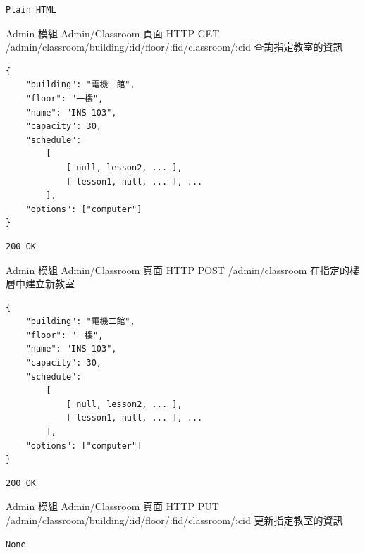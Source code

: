 \documentclass{article}
\begin{document}
\begin{lrbox}{\jsonoutputbox}
	\begin{lstlisting}
Plain HTML
\end{lstlisting}
\end{lrbox}

{Admin 模組}
{Admin/Classroom 頁面}
{HTTP GET}
{/admin/classroom/building/:id/floor/:fid/classroom/:cid}
{查詢指定教室的資訊}

\bigskip

\begin{lrbox}{\jsoninputbox}
	\begin{lstlisting}[basicstyle=\tiny\ttfamily]
{
	"building": "電機二館",
	"floor": "一樓",
	"name": "INS 103",
	"capacity": 30,
	"schedule":
		[
			[ null, lesson2, ... ],
			[ lesson1, null, ... ], ... 
		],
	"options": ["computer"]
}
\end{lstlisting}
\end{lrbox}

\begin{lrbox}{\jsonoutputbox}
	\begin{lstlisting}
200 OK
\end{lstlisting}
\end{lrbox}

{Admin 模組}
{Admin/Classroom 頁面}
{HTTP POST}
{/admin/classroom}
{在指定的樓層中建立新教室}

\bigskip

\begin{lrbox}{\jsoninputbox}
	\begin{lstlisting}[basicstyle=\tiny\ttfamily]
{
	"building": "電機二館",
	"floor": "一樓",
	"name": "INS 103",
	"capacity": 30,
	"schedule":
		[
			[ null, lesson2, ... ],
			[ lesson1, null, ... ], ... 
		],
	"options": ["computer"]
}
\end{lstlisting}
\end{lrbox}

\begin{lrbox}{\jsonoutputbox}
	\begin{lstlisting}
200 OK
\end{lstlisting}
\end{lrbox}

{Admin 模組}
{Admin/Classroom 頁面}
{HTTP PUT}
{/admin/classroom/building/:id/floor/:fid/classroom/:cid}
{更新指定教室的資訊}

\bigskip

\begin{lrbox}{\jsoninputbox}
	\begin{lstlisting}
None
\end{lstlisting}
\end{lrbox}
\end{document}
